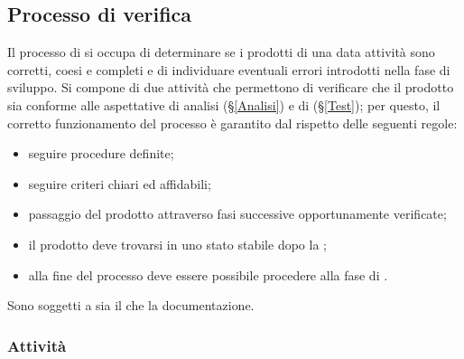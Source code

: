 {{\subsection{Processo di verifica}
Il processo di  si occupa di determinare se i prodotti di una data attività sono corretti, coesi e completi e di individuare eventuali errori introdotti nella fase di sviluppo. Si compone di due attività che permettono di verificare che il prodotto sia conforme alle aspettative di analisi (\S{}\ref{Analisi}) e di  (\S{}\ref{Test}); per questo, il corretto funzionamento del processo è garantito dal rispetto delle seguenti regole: 
\begin{itemize}
	\item seguire procedure definite;
	\item seguire criteri chiari ed affidabili;
	\item passaggio del prodotto attraverso fasi successive opportunamente verificate;
	\item il prodotto deve trovarsi in uno stato stabile dopo la ;
	\item alla fine del processo deve essere possibile procedere alla fase di .
\end{itemize}
Sono soggetti a  sia il  che la documentazione. 

\subsubsection{Attività}

}}
